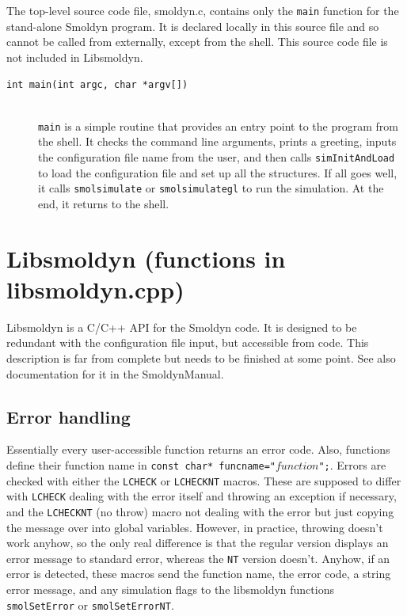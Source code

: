 \documentclass {scrbook}
\newcommand {\ttt} {\texttt}
\begin{document}
The top-level source code file, smoldyn.c, contains only the \ttt{main} function for the stand-alone Smoldyn program. It is declared locally in this source file and so cannot be called from externally, except from the shell. This source code file is not included in Libsmoldyn.

\begin{description}

\item[\ttt{int main(int argc, char *argv[])}]
\hfill \\
\ttt{main} is a simple routine that provides an entry point to the program from the shell. It checks the command line arguments, prints a greeting, inputs the configuration file name from the user, and then calls \ttt{simInitAndLoad} to load the configuration file and set up all the structures. If all goes well, it calls \ttt{smolsimulate} or \ttt{smolsimulategl} to run the simulation. At the end, it returns to the shell.

\end{description}

\section{Libsmoldyn (functions in libsmoldyn.cpp)}

Libsmoldyn is a C/C++ API for the Smoldyn code. It is designed to be redundant with the configuration file input, but accessible from code. This description is far from complete but needs to be finished at some point. See also documentation for it in the SmoldynManual.

\subsection{Error handling}

Essentially every user-accessible function returns an error code. Also, functions define their function name in \ttt{const char* funcname="}$function$\ttt{";}. Errors are checked with either the \ttt{LCHECK} or \ttt{LCHECKNT} macros. These are supposed to differ with \ttt{LCHECK} dealing with the error itself and throwing an exception if necessary, and the \ttt{LCHECKNT} (no throw) macro not dealing with the error but just copying the message over into global variables. However, in practice, throwing doesn't work anyhow, so the only real difference is that the regular version displays an error message to standard error, whereas the \ttt{NT} version doesn't. Anyhow, if an error is detected, these macros send the function name, the error code, a string error message, and any simulation flags to the libsmoldyn functions \ttt{smolSetError} or \ttt{smolSetErrorNT}.
\end{document}
